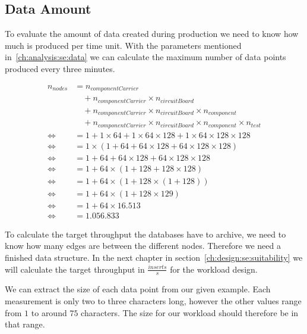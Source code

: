 \subsection{Data Amount}
\label{ch:analysis:se:dataAmount}
To evaluate the amount of data created during production we need to know how much is produced per time unit.
With the parameters mentioned in~\ref{ch:analysis:se:data} we can calculate the maximum number of data points produced every three minutes.

\begin{equation}
  \label{eq:dataAmount}
  \begin{aligned}
    n_{nodes} &= n_{componentCarrier} \\
    &\quad + n_{componentCarrier} \times n_{circuitBoard} \\
    &\quad + n_{componentCarrier} \times n_{circuitBoard} \times n_{component} \\
    &\quad + n_{componentCarrier} \times n_{circuitBoard} \times n_{component} \times n_{test} \\
    \iff &= 1 + 1 \times 64 + 1 \times 64 \times 128 + 1 \times 64 \times 128 \times 128 \\
    \iff &= 1 \times (1 + 64 + 64 \times 128 + 64 \times 128 \times 128) \\
    \iff &= 1 + 64 + 64 \times 128 + 64 \times 128 \times 128 \\
    \iff &= 1 + 64 \times (1 + 128 + 128 \times 128) \\
    \iff &= 1 + 64 \times (1 + 128 \times (1 + 128)) \\
    \iff &= 1 + 64 \times (1 + 128 \times 129) \\
    \iff &= 1 + 64 \times 16.513 \\
    \iff &= 1.056.833
  \end{aligned}
\end{equation}

To calculate the target throughput the databases have to archive,
we need to know how many edges are between the different nodes.
Therefore we need a finished data structure.
In the next chapter in section~\ref{ch:design:se:suitability} we will calculate the target throughput in $ \frac{inserts}{s} $ for the workload design.

We can extract the size of each data point from our given example.
Each measurement is only two to three characters long,
however the other values range from $ 1 $ to around $ 75 $ characters.
The size for our workload should therefore be in that range.

